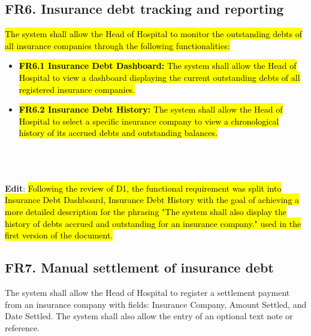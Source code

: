 \documentclass[12pt, a4paper]{article}
\begin{document}
\subsection{FR6. Insurance debt tracking and reporting} \label{FR6}
\hl{The system shall allow the Head of Hospital to monitor the outstanding debts of all insurance companies through the following functionalities:}
\begin{itemize}
    \item \hl{\textbf{FR6.1 Insurance Debt Dashboard:} The system shall allow the Head of Hospital to view a dashboard displaying the current outstanding debts of all registered insurance companies.}
    \item \hl{\textbf{FR6.2 Insurance Debt History:} The system shall allow the Head of Hospital to select a specific insurance company to view a chronological history of its accrued debts and outstanding balances.}
\end{itemize}
\\ 
\\
\\ \textbf{Edit}:
\hl{Following the review of D1, the functional requirement was split into Insurance Debt Dashboard, Insurance Debt History with the goal of achieving a more detailed description for the phrasing "The system shall also display the history of debts accrued and outstanding for an insurance company." used in the first version of the document.}


\subsection{FR7. Manual settlement of insurance debt} \label{FR7}
The system shall allow the Head of Hospital to register a settlement payment from an insurance company with fields: Insurance Company, Amount Settled, and Date Settled. The system shall also allow the entry of an optional text note or reference. 
\\ 
\\ 
\\ 
\end{document}
